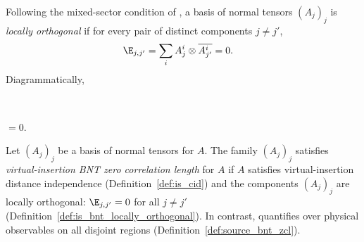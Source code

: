 \begin{definition}%
    \label{def:is_bnt_locally_orthogonal}
    \leanok
    Following the mixed-sector condition of
    \cite[Definition~3.5]{Cirac2016MPDO_arXiv}, a basis of normal tensors
    $(A_j)_j$ is \emph{locally orthogonal} if for every pair of distinct
    components $j\ne j'$,
    \begin{align}
        \E_{j,j'}
         & =\sum_i A_j^i\otimes\overline{A_{j'}^i}=0.
        \notag
    \end{align}
    Diagrammatically,
    \begin{center}
        \tenkzkernel
        \begin{tenkz}[rows={ket,bra}, cols=1, west=open, east=open]
             \\
        \end{tenkz}
        $ = 0.$
    \end{center}
\end{definition}

\begin{definition}%
    \label{def:is_bnt_zcl}
    \leanok
    Let $(A_j)_j$ be a basis of normal tensors for $A$. The family $(A_j)_j$
    satisfies \emph{virtual-insertion BNT zero correlation length} for $A$ if
    $A$ satisfies virtual-insertion distance independence
    (Definition~\ref{def:is_cid}) and the components $(A_j)_j$ are locally
    orthogonal: $\E_{j,j'}=0$ for all $j\ne j'$
    (Definition~\ref{def:is_bnt_locally_orthogonal}). In contrast,
    \cite[Definition~3.6]{Cirac2016MPDO_arXiv} quantifies over physical
    observables on all disjoint regions (Definition~\ref{def:source_bnt_zcl}).
\end{definition}

